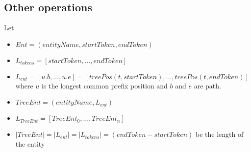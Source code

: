 \FloatBarrier

\subsection{Other operations}

Let
\begin{itemize}
	\item $Ent = (entityName, startToken, endToken)$
	\item $L_{tokens} = [startToken, \dots, endToken]$
	\item $L_{ent} = [ u.b, \dots, u.e]= [ treePos(t, startToken), \dots ,  treePos(t, endToken)]$ where $u$ is the longest common prefix position and $b$ and $e$ are path.
	\item $TreeEnt = (entityName, L_{ent})$
	\item $L_{TreeEnt} = [TreeEnt_0, \dots, TreeEnt_n]$
	\item $|TreeEnt| = |L_{ent}| = |L_{tokens}| = (endToken - startToken)$ be the length of the entity
\end{itemize}






